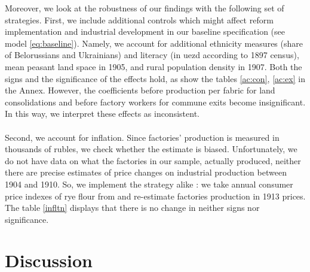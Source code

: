 \documentclass[a4paper, 12pt]{article}
\begin{document}
Moreover, we look at the robustness of our findings with the following set of strategies. First, we include additional controls which might affect reform implementation and industrial development in our baseline specification (see model \ref{eq:baseline}). Namely, we account for additional ethnicity measures (share of Belorussians and Ukrainians) and literacy (in uezd according to 1897 census), mean peasant land space in 1905, and rural population density in 1907. Both the signs and the significance of the effects hold, as show the tables \ref{ac:con}, \ref{ac:ex} in the Annex. However, the coefficients before production per fabric for land consolidations and before factory workers for commune exits become insignificant. In this way, we interpret these effects as inconsistent.
\\\\
Second, we account for inflation. Since factories' production is measured in thousands of rubles, we check whether the estimate is biased. Unfortunately, we do not have data on what the factories in our sample, actually produced, neither there are precise estimates of price changes on industrial production between 1904 and 1910. So, we implement the strategy alike \cite{markevich2018economic}: we take annual consumer price indexes of rye flour from \cite{allen2019russian} and re-estimate factories production in 1913 prices. The table \ref{infltn} displays that there is no change in neither signs nor significance.


\section{Discussion}
\end{document}
